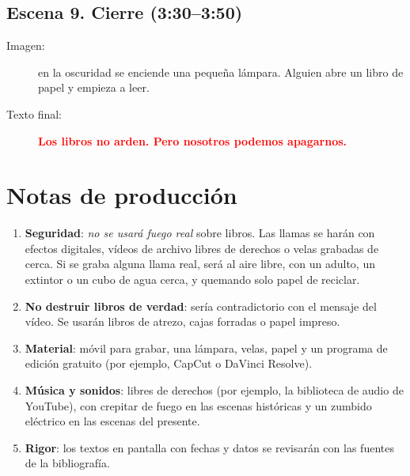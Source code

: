 \documentclass[11pt,a4paper,twoside,openright]{book}
\begin{document}
\subsection*{Escena 9. Cierre (3:30--3:50)}
\begin{description}
  \item[Imagen:] en la oscuridad se enciende una pequeña lámpara. Alguien abre un
        libro de papel y empieza a leer.
  \item[Texto final:] \textcolor{red}{\textbf{Los libros no arden. Pero nosotros
        podemos apagarnos.}}
\end{description}

\section{Notas de producción}

\begin{enumerate}
  \item \textbf{Seguridad}: \emph{no se usará fuego real} sobre libros. Las
        llamas se harán con efectos digitales, vídeos de archivo libres de
        derechos o velas grabadas de cerca. Si se graba alguna llama real, será
        al aire libre, con un adulto, un extintor o un cubo de agua cerca, y
        quemando solo papel de reciclar.
  \item \textbf{No destruir libros de verdad}: sería contradictorio con el mensaje
        del vídeo. Se usarán libros de atrezo, cajas forradas o papel impreso.
  \item \textbf{Material}: móvil para grabar, una lámpara, velas, papel y un
        programa de edición gratuito (por ejemplo, CapCut o DaVinci Resolve).
  \item \textbf{Música y sonidos}: libres de derechos (por ejemplo, la biblioteca
        de audio de YouTube), con crepitar de fuego en las escenas históricas y un
        zumbido eléctrico en las escenas del presente.
  \item \textbf{Rigor}: los textos en pantalla con fechas y datos se revisarán con
        las fuentes de la bibliografía.
\end{enumerate}


\backmatter


\end{document}
